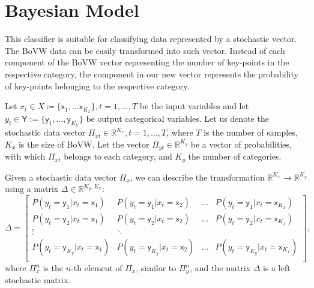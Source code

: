 \section{Bayesian Model}
This classifier is suitable for classifying data represented by a stochastic vector. The BoVW data can be easily transformed into such vector. Instead of each component of the BoVW vector representing the number of key-points in the respective category, the component in our new vector represents the probability of key-points belonging to the respective category.

Let $x_t \in X \coloneqq \lbrace \mathsf{x}_1, \dots \mathsf{x}_{K_x} \rbrace, t = 1,\dots,T$ be the input variables and let $y_t \in \mathsf{Y} := \lbrace \mathsf{y}_1, \dots, \mathsf{y}_{K_Y} \rbrace$ be output categorical variables.
Let us denote the stochastic data vector $\Pi_{xt} \in \mathbb{R}^{K_x}, t=1,\dots,T$, where $T$ is the number of samples, $K_x$ is the size of BoVW. Let the vector $\Pi_{yt}\in \mathbb{R}^{K_y}$ be a vector of probabilities, with which $\Pi_{xt}$ belongs to each category, and $K_y$ the number of categories.

Given a stochastic data vector $\Pi_x$, we can describe the transformation $\mathbb{R}^{K_x} \rightarrow \mathbb{R}^{K_y}$ using a matrix $\Delta \in \mathbb{R}^{K_y, K_x}$:
\begin{equation}
    \Delta =
    \begin{bmatrix}
        P(y_t = \mathsf{y}_1 | x_t = \mathsf{x}_1) & P(y_t = \mathsf{y}_1 | x_t = \mathsf{x}_2) & \dots & P(y_t = \mathsf{y}_1 | x_t = \mathsf{x}_{K_x})\\
        P(y_t = \mathsf{y}_2 | x_t = \mathsf{x}_1) & P(y_t = \mathsf{y}_2 | x_t = \mathsf{x}_2) & \dots & P(y_t = \mathsf{y}_2 | x_t = \mathsf{x}_{K_x})\\
        \vdots & \ddots\\
        P(y_t = \mathsf{y}_{K_y} | x_t = \mathsf{x}_1) & P(y_t = \mathsf{y}_{K_y} | x_t = \mathsf{x}_2) & \dots & P(y_t = \mathsf{y}_{K_y} | x_t = \mathsf{x}_{K_x})\\
    \end{bmatrix},
\end{equation}
where $\Pi_x^n$ is the $n$-th element of $\Pi_x$, similar to $\Pi_y^n$, and the matrix $\Delta$ is a left stochastic matrix.

